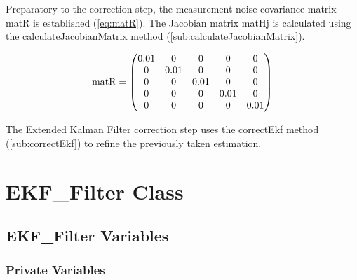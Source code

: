 Preparatory to the correction step, the measurement noise covariance matrix matR is established (\ref{eq:matR}). The Jacobian matrix matHj is calculated using the calculateJacobianMatrix method (\ref{sub:calculateJacobianMatrix}).

\begin{equation}
	\begin{centering}
		\textrm{matR} =
		\begin{pmatrix}
			0.01 & 0 & 0 & 0 & 0 \\
			0 & 0.01 & 0 & 0 & 0 \\
			0 & 0 & 0.01 & 0 & 0 \\
			0 & 0 & 0 & 0.01 & 0 \\
			0 & 0 & 0 & 0 & 0.01 \\
		\end{pmatrix}
	\end{centering}
	\label{eq:matR}
\end{equation}

The Extended Kalman Filter correction step uses the correctEkf method (\ref{sub:correctEkf}) to refine the previously taken estimation. 

\section{EKF\_Filter Class}
\label{sec:EKF_Filter Class}

\subsection{EKF\_Filter Variables}
\label{sub:EKF_Filter_Variables}

\subsubsection{Private Variables}

